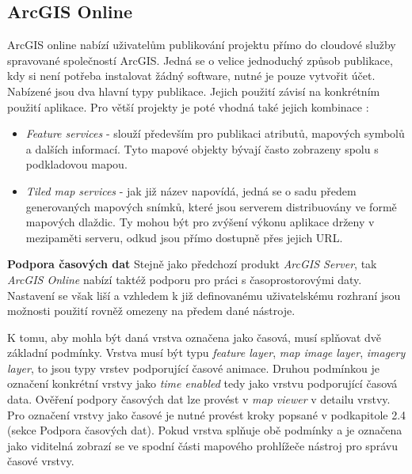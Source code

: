\subsection{ArcGIS Online}

ArcGIS online nabízí uživatelům publikování projektu přímo do cloudové
služby spravované společností ArcGIS. Jedná se o velice jednoduchý
způsob publikace, kdy si není potřeba instalovat žádný software, nutné
je pouze vytvořit účet. Nabízené jsou dva hlavní typy
publikace. Jejich použití závisí na konkrétním použití aplikace. Pro
větší projekty je poté vhodná také jejich kombinace
\cite{arcgis-publishing-service}:
\begin{itemize}
	\item \textit{Feature services} - slouží především pro
publikaci atributů, mapových symbolů a dalších informací. Tyto mapové
objekty bývají často zobrazeny spolu s podkladovou mapou.
	\item \textit{Tiled map services} - jak již název napovídá,
jedná se o sadu předem generovaných mapových snímků, které jsou
serverem distribuovány ve formě mapových dlaždic. Ty mohou být pro
zvýšení výkonu aplikace drženy v mezipaměti serveru, odkud jsou přímo
dostupně přes jejich URL.
\end{itemize}

\bigskip
\noindent \textbf{Podpora časových dat} Stejně jako předchozí produkt
\textit{ArcGIS Server}, tak \textit{ArcGIS Online} nabízí taktéž
podporu pro práci s časoprostorovými daty. Nastavení se však liší a
vzhledem k již definovanému uživatelskému rozhraní jsou možnosti
použití rovněž omezeny na předem dané nástroje.

K tomu, aby mohla být daná vrstva označena jako časová, musí splňovat
dvě základní podmínky. Vrstva musí být typu \textit{feature layer},
\textit{map image layer}, \textit{imagery layer}, to jsou typy vrstev
podporující časové animace. Druhou podmínkou je označení konkrétní
vrstvy jako \textit{time enabled} tedy jako vrstvu podporující časová
data. Ověření podpory časových dat lze provést v \textit{map viewer} v
detailu vrstvy. Pro označení vrstvy jako časové je nutné provést kroky
popsané v podkapitole 2.4 (sekce Podpora časových dat). Pokud vrstva
splňuje obě podmínky a je označena jako viditelná zobrazí se ve spodní
části mapového prohlížeče nástroj pro správu časové vrstvy.

